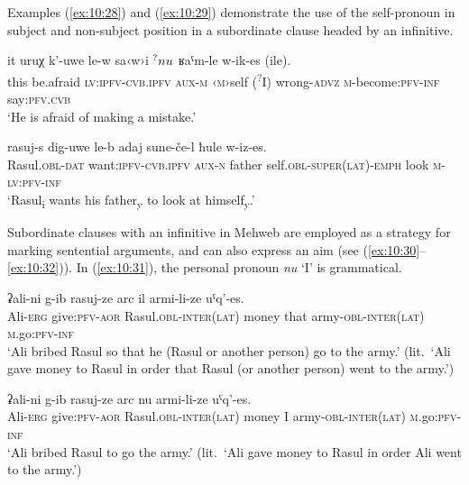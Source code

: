 ﻿\documentclass[output=paper]{langsci/langscibook}
\begin{document}
Examples (\ref{ex:10:28}) and (\ref{ex:10:29}) demonstrate the use of the self-pronoun in
subject and non-subject position in a subordinate clause headed by an
infinitive.

\ea \label{ex:10:28} %
\gll  it uruχ k'-uwe le-w sa‹w›i \(\textsuperscript{?}nu\) ʁaˤm-le w-ik-es (ile).\\
this be.afraid \textsc{lv}:\textsc{ipfv}-\textsc{cvb.ipfv} \textsc{aux}-\textsc{m} ‹\textsc{m}›self (\textsuperscript{?}I) wrong-\textsc{advz} \textsc{m}-become:\textsc{pfv}-\textsc{inf} say:\textsc{pfv}.\textsc{cvb}\\ 
\glt `He is afraid of making a mistake.'

\ex \label{ex:10:29} %
\gll  rasuj-s dig-uwe le-b adaj sune-če-l ħule w-iz-es.\\
Rasul.\textsc{obl}-\textsc{dat} want:\textsc{ipfv}-\textsc{cvb.ipfv} \textsc{aux}-\textsc{n} father self.\textsc{obl}-\textsc{super}(\textsc{lat})-\textsc{emph} look \textsc{m}-\textsc{lv}:\textsc{pfv}-\textsc{inf}\\ 
\glt `Rasul\textsubscript{i} wants his father\textsubscript{y} to look at
himself\textsubscript{y}.'
\z

Subordinate clauses with an infinitive in Mehweb are employed as a
strategy for marking sentential arguments, and can also express an aim
(see (\ref{ex:10:30}–\ref{ex:10:32})). In (\ref{ex:10:31}), the personal pronoun \emph{nu} `I' is
grammatical.

\ea \label{ex:10:30} %
\gll  ʡali-ni g-ib rasuj-ze arc il armi-li-ze uˤq'-es.\\
Ali-\textsc{erg} give:\textsc{pfv}-\textsc{aor} Rasul.\textsc{obl}-\textsc{inter}(\textsc{lat}) money that army-\textsc{obl}-\textsc{inter}(\textsc{lat}) \textsc{m}.go:\textsc{pfv}-\textsc{inf}\\ 
\glt `Ali bribed Rasul so that he (Rasul or another person) go to the army.'
(lit.\ `Ali gave money to Rasul in order that Rasul (or another person)
went to the army.')

\ex \label{ex:10:31} %
\gll  ʡali-ni g-ib rasuj-ze arc nu armi-li-ze uˤq'-es.\\
Ali-\textsc{erg} give:\textsc{pfv}-\textsc{aor} Rasul.\textsc{obl}-\textsc{inter}(\textsc{lat}) money I army-\textsc{obl}-\textsc{inter}(\textsc{lat}) \textsc{m}.go:\textsc{pfv}-\textsc{inf}\\ 
\glt `Ali bribed Rasul to go the army.'
(lit.\ `Ali gave money to Rasul in order Ali went to the army.')\pagebreak[4]
\end{document}
